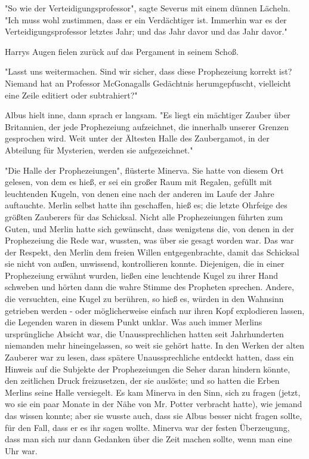 {"So wie der Verteidigungsprofessor", sagte Severus mit einem dünnen Lächeln. "Ich muss wohl zustimmen, dass er ein Verdächtiger ist. Immerhin war es der Verteidigungsprofessor letztes Jahr; und das Jahr davor und das Jahr davor."

Harrys Augen fielen zurück auf das Pergament in seinem Schoß.

"Lasst uns weitermachen. Sind wir sicher, dass diese Prophezeiung korrekt ist? Niemand hat an Professor McGonagalls Gedächtnis herumgepfuscht, vielleicht eine Zeile editiert oder subtrahiert?"

Albus hielt inne, dann sprach er langsam. "Es liegt ein mächtiger Zauber über Britannien, der jede Prophezeiung aufzeichnet, die innerhalb unserer Grenzen gesprochen wird. Weit unter der Ältesten Halle des Zaubergamot, in der Abteilung für Mysterien, werden sie aufgezeichnet."

"Die Halle der Prophezeiungen", flüsterte Minerva. Sie hatte von diesem Ort gelesen, von dem es hieß, er sei ein großer Raum mit Regalen, gefüllt mit leuchtenden Kugeln, von denen eine nach der anderen im Laufe der Jahre auftauchte. Merlin selbst hatte ihn geschaffen, hieß es; die letzte Ohrfeige des größten Zauberers für das Schicksal. Nicht alle Prophezeiungen führten zum Guten, und Merlin hatte sich gewünscht, dass wenigstens die, von denen in der Prophezeiung die Rede war, wussten, was über sie gesagt worden war. Das war der Respekt, den Merlin dem freien Willen entgegenbrachte, damit das Schicksal sie nicht von außen, unwissend, kontrollieren konnte. Diejenigen, die in einer Prophezeiung erwähnt wurden, ließen eine leuchtende Kugel zu ihrer Hand schweben und hörten dann die wahre Stimme des Propheten sprechen. Andere, die versuchten, eine Kugel zu berühren, so hieß es, würden in den Wahnsinn getrieben werden - oder möglicherweise einfach nur ihren Kopf explodieren lassen, die Legenden waren in diesem Punkt unklar. Was auch immer Merlins ursprüngliche Absicht war, die Unaussprechlichen hatten seit Jahrhunderten niemanden mehr hineingelassen, so weit sie gehört hatte. In den Werken der alten Zauberer war zu lesen, dass spätere Unaussprechliche entdeckt hatten, dass ein Hinweis auf die Subjekte der Prophezeiungen die Seher daran hindern könnte, den zeitlichen Druck freizusetzen, der sie auslöste; und so hatten die Erben Merlins seine Halle versiegelt. Es kam Minerva in den Sinn, sich zu fragen (jetzt, wo sie ein paar Monate in der Nähe von Mr. Potter verbracht hatte), wie jemand das wissen konnte; aber sie wusste auch, dass sie Albus besser nicht fragen sollte, für den Fall, dass er es ihr sagen wollte. Minerva war der festen Überzeugung, dass man sich nur dann Gedanken über die Zeit machen sollte, wenn man eine Uhr war.

}
